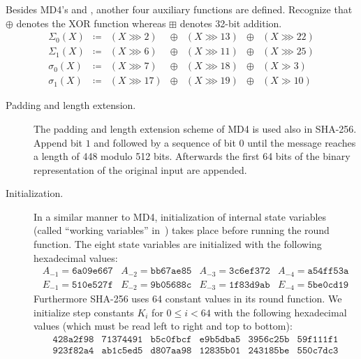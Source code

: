 %
Besides MD4's  and ,
another four auxiliary functions are defined. Recognize that $\oplus$ denotes
the XOR function whereas $\boxplus$ denotes 32-bit addition.
\[
  \begin{array}{rcccccl}
    \Sigma_0(X) &\coloneqq& (X ⋙ 2) &\oplus& (X ⋙ 13) &\oplus& (X ⋙ 22) \\
    \Sigma_1(X) &\coloneqq& (X ⋙ 6) &\oplus& (X ⋙ 11) &\oplus& (X ⋙ 25) \\
    \sigma_0(X) &\coloneqq& (X ⋙ 7) &\oplus& (X ⋙ 18) &\oplus& (X ≫ 3) \\
    \sigma_1(X) &\coloneqq& (X ⋙ 17) &\oplus& (X ⋙ 19) &\oplus& (X ≫ 10)
  \end{array}
\]
%
\begin{description}
  \item[Padding and length extension.]
    The padding and length extension scheme of MD4 is used also in SHA-256.
    Append bit $1$ and followed by a sequence of bit $0$ until the message reaches a length
    of 448 modulo 512 bits. Afterwards the first 64 bits of the binary representation
    of the original input are appended.
  \item[Initialization.]
    In a similar manner to MD4, initialization of internal state variables
    (called \enquote{working variables} in~\cite[Section~6.2.2]{fips-pub-180-4})
    takes place before running the round function. The eight state variables
    are initialized with the following hexadecimal values:
    \[
      \begin{array}{llll}
        A_{-1} = \texttt{6a09e667} &
        A_{-2} = \texttt{bb67ae85} &
        A_{-3} = \texttt{3c6ef372} &
        A_{-4} = \texttt{a54ff53a} \\
        E_{-1} = \texttt{510e527f} &
        E_{-2} = \texttt{9b05688c} &
        E_{-3} = \texttt{1f83d9ab} &
        E_{-4} = \texttt{5be0cd19}
      \end{array}
    \]
    Furthermore SHA-256 uses 64 constant values in its round function.
    We initialize step constants $K_i$ for $0 \leq i < 64$ with the following hexadecimal
    values (which must be read left to right and top to bottom):
    \[
      \begin{array}{cccccc}
        \texttt{428a2f98} & \texttt{71374491} & \texttt{b5c0fbcf} & \texttt{e9b5dba5} & \texttt{3956c25b} & \texttt{59f111f1} \\
        \texttt{923f82a4} & \texttt{ab1c5ed5} & \texttt{d807aa98} & \texttt{12835b01} & \texttt{243185be} & \texttt{550c7dc3} \\

\end{array}\]
\end{description}
